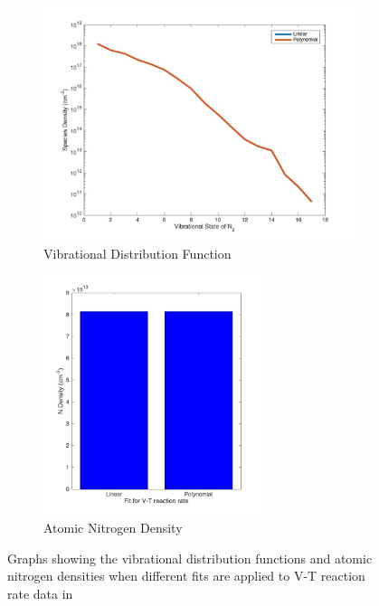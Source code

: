 \documentclass[11pt, oneside]{article}   	%
\begin{document}
\begin{figure}
\begin{subfigure}{0.5\textwidth}
\includegraphics[width=\textwidth]{Figures/VDF}
\caption{Vibrational Distribution Function}
\label{subfig:VDF}
\end{subfigure}
\begin{subfigure}{0.5\textwidth}
\begin{center}
\includegraphics[width=0.7\textwidth]{Figures/Ndensity}
\caption{Atomic Nitrogen Density}
\end{center}
\end{subfigure}
\caption{Graphs showing the vibrational distribution functions and atomic nitrogen densities when different fits are applied to V-T reaction rate data in \cite{Billing1979vv}}
\label{fig:VDFandN}
\end{figure}
\end{document}
